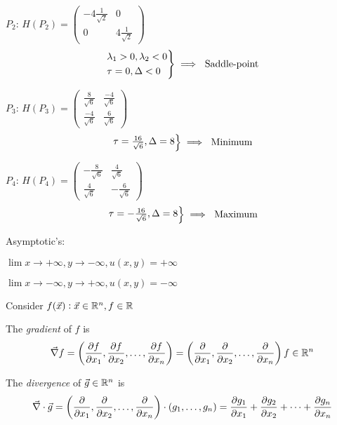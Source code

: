 \documentclass[twoside]{scrartcl}
\begin{document}
\begin{example}
\begin{enumerate}
$P_2$: 
$H(P_2) = \begin{pmatrix}
 -4\frac{1}{\sqrt{2}}& 0 \\ 0 & 4\frac{1}{\sqrt{2}}	
 \end{pmatrix}
$
\[\begin{rcases*}
\lambda_1 > 0, \lambda_2 < 0 \\
\tau = 0, \Delta < 0	
\end{rcases*}\implies \text{ Saddle-point}
\]

$P_3$: 
$H(P_3) = \begin{pmatrix}
 \frac{8}{\sqrt{6}}& \frac{-4}{\sqrt{6}} \\ \frac{-4}{\sqrt{6}} & \frac{6}{\sqrt{6}}	
 \end{pmatrix}
$
\[\begin{rcases*}
\tau = \frac{16}{\sqrt{6}}, \Delta = 8
\end{rcases*}\implies \text{ Minimum}
\]

$P_4$: 
$H(P_4) = \begin{pmatrix}
 -\frac{8}{\sqrt{6}}& \frac{4}{\sqrt{6}} \\ \frac{4}{\sqrt{6}} & -\frac{6}{\sqrt{6}}	
 \end{pmatrix}
$
\[\begin{rcases*}
\tau = -\frac{16}{\sqrt{6}}, \Delta = 8
\end{rcases*}\implies \text{ Maximum}
\]


\end{enumerate}
\vspace*{150pt}

Asymptotic's:

$\lim x \to +\infty, y \to -\infty, u(x,y) = +\infty$

$\lim x \to -\infty, y \to +\infty, u(x,y) = -\infty$
\end{example}



\vspace*{5pt}


Consider $f(\vec{x}): \vec{x} \in\mathbb{R}^n, f \in\mathbb{R}$\\

\begin{definition}
The \emph{gradient} of $f$ is
\[\vec{\nabla}f = \left(\frac{\partial f}{\partial x_1}, \frac{\partial f}{\partial x_2},\dots,\frac{\partial f}{\partial x_n}\right) = \left(\frac{\partial}{\partial x_1}, \frac{\partial}{\partial x_2},\dots,\frac{\partial}{\partial x_n}\right)f \in\mathbb{R}^n\]

The \emph{divergence} of $\vec{g} \in\mathbb{R}^n$ is 
\[\vec{\nabla}\cdot \vec{g} = \left(\frac{\partial}{\partial x_1},\frac{\partial}{\partial x_2},\dots,\frac{\partial}{\partial x_n}\right)\cdot(g_1,\dots,g_n) = \frac{\partial g_1}{\partial x_1} + \frac{\partial g_2}{\partial x_2} + \dots + \frac{\partial g_n}{\partial x_n}\]
\end{definition}
\end{document}
